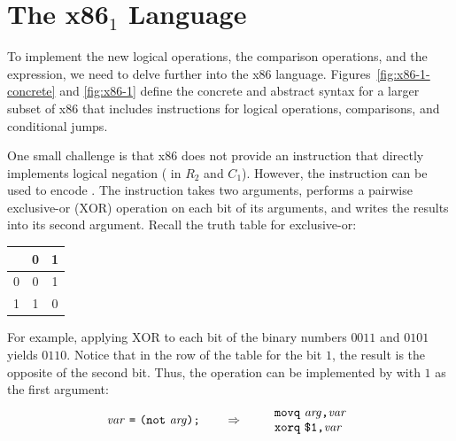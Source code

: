 \documentclass[11pt]{book}
\begin{document}
\section{The x86$_1$ Language}
\label{sec:x86-1}

To implement the new logical operations, the comparison operations,
and the  expression, we need to delve further into the x86
language. Figures~\ref{fig:x86-1-concrete} and \ref{fig:x86-1} define
the concrete and abstract syntax for a larger subset of x86 that
includes instructions for logical operations, comparisons, and
conditional jumps.

One small challenge is that x86 does not provide an instruction that
directly implements logical negation ( in $R_2$ and $C_1$).
However, the  instruction can be used to encode .
The  instruction takes two arguments, performs a pairwise
exclusive-or ($\mathrm{XOR}$) operation on each bit of its arguments,
and writes the results into its second argument.  Recall the truth
table for exclusive-or:
\begin{center}
\begin{tabular}{l|cc}
   & 0 & 1 \\ \hline
0  & 0 & 1 \\
1  & 1 & 0
\end{tabular}
\end{center}
For example, applying $\mathrm{XOR}$ to each bit of the binary numbers
$0011$ and $0101$ yields $0110$. Notice that in the row of the table
for the bit $1$, the result is the opposite of the second bit.  Thus,
the  operation can be implemented by  with $1$ as
the first argument:
\[
\mathit{var}~ \texttt{=}~ \texttt{(}\texttt{not}~\mathit{arg}\texttt{)}\texttt{;}
\qquad\Rightarrow\qquad
\begin{array}{l}
\texttt{movq}~ \mathit{arg}\texttt{,} \mathit{var}\\
\texttt{xorq}~ \texttt{\$1,} \mathit{var}
\end{array}
\]
\end{document}
